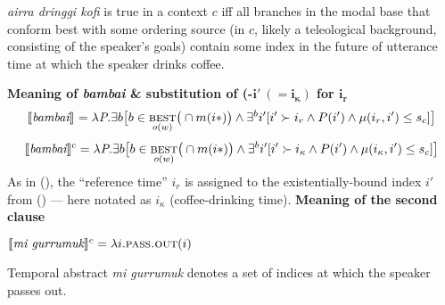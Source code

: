 \textit{airra dringgi kofi} is true in a context $ c $ iff all branches in the modal base that conform best with some ordering source (in $ c $, likely a teleological background, consisting of the speaker's goals) contain some index in the future of utterance time at which the speaker drinks coffee.

\a \textbf{Meaning of \textit{bambai} \& substitution of  (-$\boldsymbol{i'\ (=i_\kappa)}$ for $ \boldsymbol{i_r} $}
$$\begin{multlined}
	\denote{\textit{bambai}}=\lambda\textit{P}.\exists b
	\big[b\in\underset{o(w)}{\textsc{best}}\big(\cap m(i*)\big)\wedge \exists ^bi'[i'\succ i_r\wedge P(i')\wedge\mu(i_r,i')\leq s_c]\big]\end{multlined}$$
$$\begin{multlined}	\denote[c]{\textit{bambai}}=\lambda\textit{P}.\exists b
	\big[b\in\underset{o(w)}{\textsc{best}}\big(\cap m(i*)\big)\wedge \exists ^bi'[i'\succ i_\kappa\wedge P(i')\wedge\mu(i_\kappa,i')\leq s_c]\big]
\end{multlined}$$
As in (), the ``reference time'' $i_r$ is assigned to the existentially-bound index $ i' $ from () --- here notated as $ i_\kappa $ (coffee-drinking time).
\a\textbf{Meaning of the second clause}

$ \denote[c]{\textit{mi gurrumuk}} = \lambda i.\textsc{pass.out}(i)$%

Temporal abstract \textit{mi gurrumuk} denotes a set of indices at which the speaker passes out.



